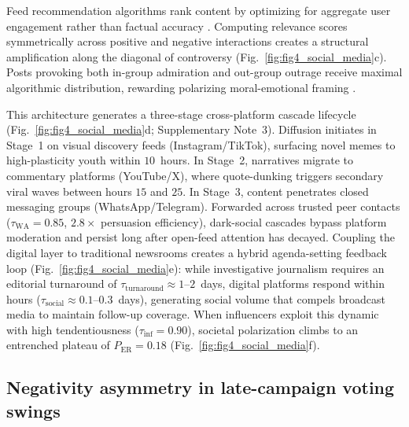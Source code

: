 \documentclass[11pt,a4paper]{article}
\begin{document}
Feed recommendation algorithms rank content by optimizing for aggregate user engagement rather than factual accuracy \citep{vosoughi2018spread, crockett2017moral}. Computing relevance scores symmetrically across positive and negative interactions creates a structural amplification along the diagonal of controversy (Fig.~\ref{fig:fig4_social_media}c). Posts provoking both in-group admiration and out-group outrage receive maximal algorithmic distribution, rewarding polarizing moral-emotional framing \citep{brady2017emotion, crockett2017moral}.

This architecture generates a three-stage cross-platform cascade lifecycle (Fig.~\ref{fig:fig4_social_media}d; Supplementary Note~3). Diffusion initiates in Stage~1 on visual discovery feeds (Instagram/TikTok), surfacing novel memes to high-plasticity youth within $10$~hours. In Stage~2, narratives migrate to commentary platforms (YouTube/X), where quote-dunking triggers secondary viral waves between hours $15$ and $25$. In Stage~3, content penetrates closed messaging groups (WhatsApp/Telegram). Forwarded across trusted peer contacts ($\tau_{\text{WA}} = 0.85$, $2.8\times$ persuasion efficiency), dark-social cascades bypass platform moderation and persist long after open-feed attention has decayed. Coupling the digital layer to traditional newsrooms creates a hybrid agenda-setting feedback loop \citep{chadwick2017hybrid, harder2017intermedia} (Fig.~\ref{fig:fig4_social_media}e): while investigative journalism requires an editorial turnaround of $\tau_{\mathrm{turnaround}} \approx 1$--$2$~days, digital platforms respond within hours ($\tau_{\mathrm{social}} \approx 0.1$--$0.3$~days), generating social volume that compels broadcast media to maintain follow-up coverage. When influencers exploit this dynamic with high tendentiousness ($\tau_{\mathrm{inf}} = 0.90$), societal polarization climbs to an entrenched plateau of $P_{\mathrm{ER}} = 0.18$ (Fig.~\ref{fig:fig4_social_media}f).

\subsection*{Negativity asymmetry in late-campaign voting swings}
\end{document}
